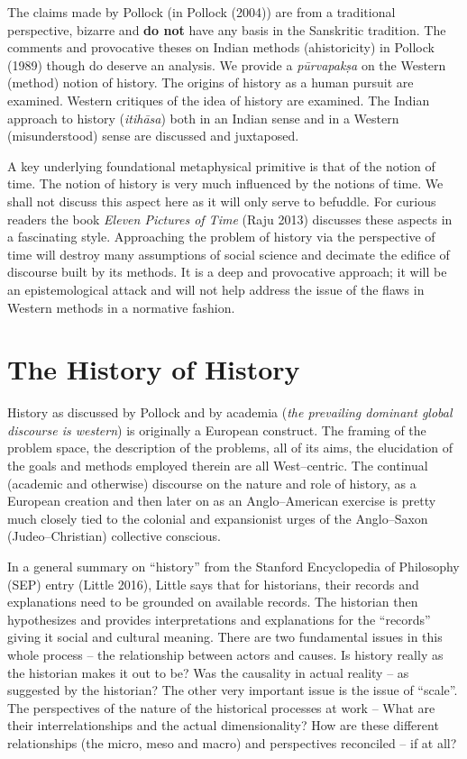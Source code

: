 \vskip -5pt

The claims made by Pollock (in Pollock (2004)) are from a traditional perspective, bizarre and \textbf{do not} have any basis in the Sanskritic tradition. The comments and provocative theses on Indian methods (ahistoricity) in Pollock (1989) though do deserve an analysis. We provide a \textit{pūrvapakṣa} on the Western (method) notion of history. The origins of history as a human pursuit are examined. Western critiques of the idea of history are examined. The Indian approach to history (\textit{itihāsa}) both in an Indian sense and in a Western (misunderstood) sense are discussed and juxtaposed.

A key underlying foundational metaphysical primitive is that of the notion of time. The notion of history is very much influenced by the notions of time. We shall not discuss this aspect here as it will only serve to befuddle. For curious readers the book \textit{Eleven Pictures of Time} (Raju 2013) discusses these aspects in a fascinating style. Approaching the problem of history via the perspective of time will destroy many assumptions of social science and decimate the edifice of discourse built by its methods. It is a deep and provocative approach; it will be an epistemological attack and will not help address the issue of the flaws in Western methods in a normative fashion.


\section*{The History of History}

\vskip -5pt

History as discussed by Pollock and by academia (\textit{the prevailing dominant global discourse is western}) is originally a European construct. The framing of the problem space, the description of the problems, all of its aims, the elucidation of the goals and methods employed therein are all West–centric. The continual (academic and otherwise) discourse on the nature and role of history, as a European creation and then later on as an Anglo–American exercise is pretty much closely tied to the colonial and expansionist urges of the Anglo–Saxon (Judeo–Christian) collective conscious.

In a general summary on “history” from the Stanford Encyclopedia of Philosophy (SEP) entry (Little 2016), Little says that for historians, their records and explanations need to be grounded on available records. The historian then hypothesizes and provides interpretations and explanations for the “records” giving it social and cultural meaning. There are two fundamental issues in this whole process – the relationship between actors and causes. Is history really as the historian makes it out to be? Was the causality in actual reality – as suggested by the historian? The other very important issue is the issue of “scale”. The perspectives of the nature of the historical processes at work – What are their interrelationships and the actual dimensionality? How are these different relationships (the micro, meso and macro) and perspectives reconciled – if at all?

